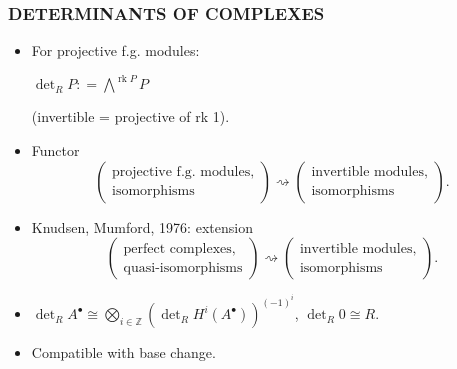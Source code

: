 \documentclass[handout]{beamer}
\newcommand{\ZZ}{\mathbb{Z}}
\newcommand{\dfn}{\mathrel{\mathop:}=}
\DeclareMathOperator{\rk}{rk}
\begin{document}

\begin{frame}
  \frametitle{DETERMINANTS OF COMPLEXES}

  \begin{itemize}
  \item<2-> For projective f.g. modules:

    $\det\nolimits_R P \dfn \bigwedge^{\rk P} P$

    (invertible = projective of rk 1).

  \item<3-> Functor
    \[ \left(\!\!\begin{array}{c}
              \text{projective f.g. modules}, \\
              \text{isomorphisms}
       \end{array}\!\!\right) \rightsquigarrow
       \left(\!\!\begin{array}{c}
               \text{invertible modules}, \\
               \text{isomorphisms}
       \end{array}\!\!\right). \]

  \item<4-> Knudsen, Mumford, 1976: extension
    \[ \left(\!\!\begin{array}{c}
                   \text{perfect complexes}, \\
                   \text{quasi-isomorphisms}
                 \end{array}\!\!\right) \rightsquigarrow
               \left(\!\!\begin{array}{c}
                           \text{invertible modules}, \\
                           \text{isomorphisms}
                         \end{array}\!\!\right). \]

  \item<5-> $\det\nolimits_R A^\bullet \cong \bigotimes_{i\in \ZZ} (\det_R H^i (A^\bullet))^{(-1)^i}$,
   $\det\nolimits_R 0 \cong R$.

  \item<6-> Compatible with base change.
  \end{itemize}
\end{frame}

\end{document}
